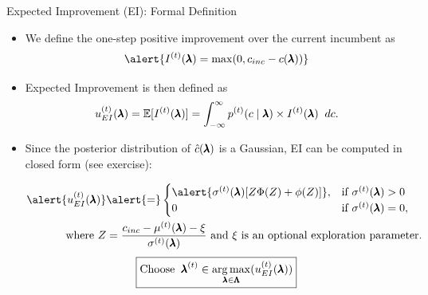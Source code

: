 \begin{frame}[c]{Expected Improvement (EI): Formal Definition}
    \begin{itemize}\abovedisplayskip=0em\belowdisplayskip=-0.75em
        \item We define the one-step positive \alert{improvement over the current incumbent} as
        \smallskip
        \[
            \alert{\iter{I}(\conf) = \max(0, \cost_{inc} - \cost(\conf))}
        \]
        \smallskip
        \item Expected Improvement is then defined as \alert{\[\iter{\acq}_{EI}(\conf) = \E[\iter{I}(\conf)] = \int_{-\infty}^{\infty} \iter{p}(\cost \mid \conf) \times \iter[\bocount]{I}(\conf)\;\; d\cost.\]}
        \fhpause
        \smallskip
        \item Since the posterior distribution of $\surro(\conf)$ is a Gaussian, EI can be computed in closed form (see exercise):
        
        \begin{align*}
            \alert{\iter{\acq}_{EI}(\conf)} &\alert{=} 
            \begin{cases}
                \alert{\iter{\stddev}(\conf)[Z\cdf(Z) + \pdf(Z)]}, & \text{if }\iter{\stddev}(\conf) > 0 \\
                0 & \text{if }\iter{\stddev}(\conf) = 0,
            \end{cases}\\
            \text{where }Z &=\dfrac{\cost_{inc} - \iter{\mean}(\conf) - \xi}{\iter{\stddev}(\conf)}
            \text{ and } \xi \text{ is an optional exploration parameter.}
        \end{align*}
    \fhpause
    \bigskip
    \[\boxed{\text{Choose}\;\;\bonextsample \in \argmax_{\conf\in\pcs}(\iter{\acq}_{EI}(\conf))}
    \]
    \end{itemize}
\end{frame}
